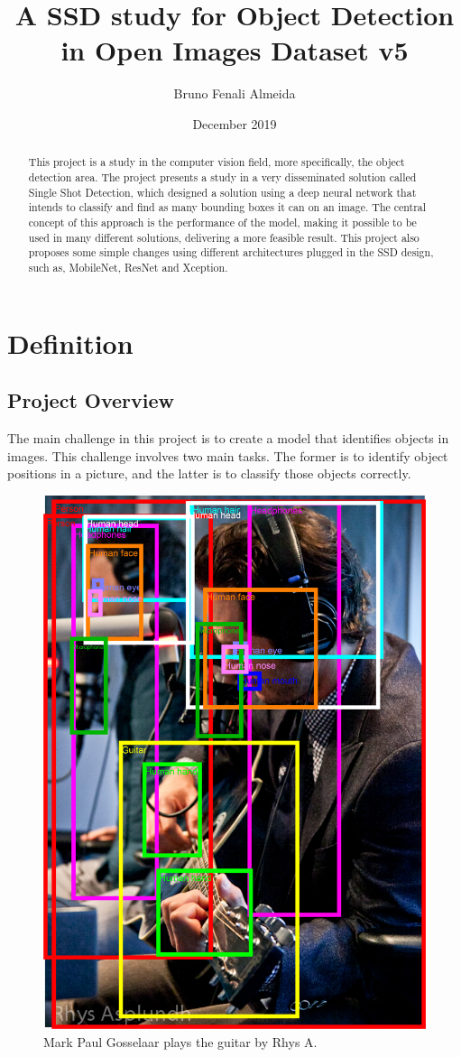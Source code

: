 \documentclass[11pt, a4paper, twocolumn]{article}
\title{\textbf{A SSD study for Object Detection in Open Images Dataset v5}}
\author{Bruno Fenali Almeida}
\date{December 2019}
\begin{document}
\begin{titlingpage}
	\maketitle
	\begin{abstract}
		This project is a study in the computer vision field, more specifically, the object detection area. The project presents a study in a very disseminated solution called Single Shot Detection, which designed a solution using a deep neural network that intends to classify and find as many bounding boxes it can on an image. The central concept of this approach is the performance of the model, making it possible to be used in many different solutions, delivering a more feasible result. This project also proposes some simple changes using different architectures plugged in the SSD design, such as, MobileNet, ResNet and Xception.
	\end{abstract}
\end{titlingpage}

\section{Definition}
\subsection{Project Overview}
The main challenge in this project is to create a model that identifies objects in images. This challenge involves two main tasks. The former is to identify object positions in a picture, and the latter is to classify those objects correctly. 

\begin{figure}[ht]
	\centering
	\includegraphics[width=.4\textwidth]{intro-1.png}
	\caption{\scriptsize Mark Paul Gosselaar plays the guitar by Rhys A. \cite{google:1}}
\end{figure}
\end{document}
